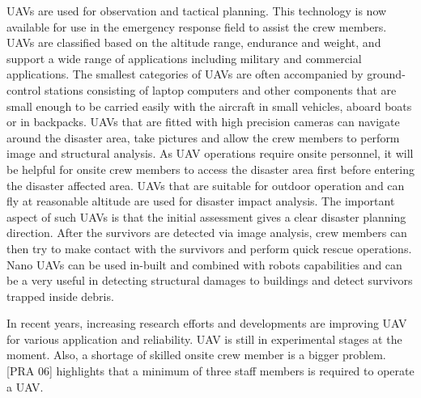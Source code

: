 UAVs are used for observation and tactical planning. This technology is now available for use in the emergency response field to assist the crew members. UAVs are classified based on the altitude range, endurance and weight, and support a wide range of applications including military and commercial applications. The smallest categories of UAVs are often accompanied by ground-control stations consisting of laptop computers and other components that are small enough to be carried easily with the aircraft in small vehicles, aboard boats or in backpacks. UAVs that are fitted with high precision cameras can navigate around the disaster area, take pictures and allow the crew members to perform image and structural analysis. As UAV operations require onsite personnel, it will be helpful for onsite crew members to access the disaster area first before entering the disaster affected area. UAVs that are suitable for outdoor operation and can fly at reasonable altitude are used for disaster impact analysis. The important aspect of such UAVs is that the initial assessment gives a clear disaster planning direction. After the survivors are detected via image analysis, crew members can then try to make contact with the survivors and perform quick rescue operations. Nano UAVs can be used in-built and combined with robots capabilities and can be a very useful in detecting structural damages to buildings and detect survivors trapped inside debris.

In recent years, increasing research efforts and developments are improving UAV for various application and reliability. UAV is still in experimental stages at the moment. Also, a shortage of skilled onsite crew member is a bigger problem. [PRA 06] highlights that a minimum of three staff members is required to operate a UAV.



